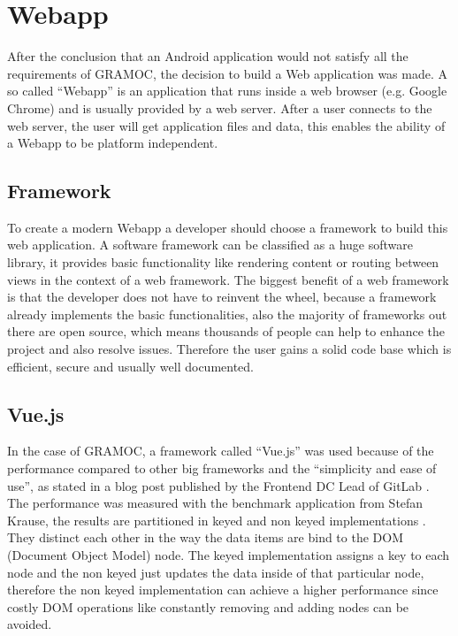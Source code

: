 \chapter{Webapp}
\label{ch:Webapp}

\author{Nico Leidenfrost}

After the conclusion that an Android application would not satisfy all the requirements of GRAMOC, the decision to build a Web application was made. A so called ``Webapp'' is an application that runs inside a web browser (e.g. Google Chrome) and is usually provided by a web server. After a user connects to the web server, the user will get application files and data, this enables the ability of a Webapp to be platform independent.

\section{Framework}
To create a modern Webapp a developer should choose a framework to build this web application. A software framework can be classified as a huge software library, it provides basic functionality like rendering content or routing between views in the context of a web framework. The biggest benefit of a web framework is that the developer does not have to reinvent the wheel, because a framework already implements the basic functionalities, also the majority of frameworks out there are open source, which means thousands of people can help to enhance the project and also resolve issues. Therefore the user gains a solid code base which is efficient, secure and usually well documented.

\section{Vue.js}
In the case of GRAMOC, a framework called ``Vue.js'' was used because of the performance compared to other big frameworks and the ``simplicity and ease of use'', as stated in a blog post published by the Frontend DC Lead of GitLab \cite{Vue} \cite{WhyVue} \cite{GitLab}. The performance was measured with the benchmark application from Stefan Krause, the results are partitioned in keyed and non keyed implementations \cite{FrameworkBenchmark}. They distinct each other in the way the data items are bind to the DOM (Document Object Model) node. The keyed implementation assigns a key to each node and the non keyed just updates the data inside of that particular node, therefore the non keyed implementation can achieve a higher performance since costly DOM operations like constantly removing and adding nodes can be avoided.

